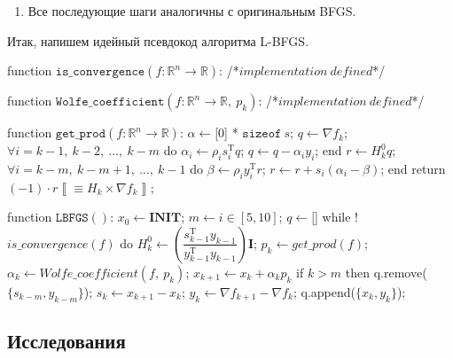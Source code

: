 \documentclass[12pt, a4paper, oneside, final]{article}
\begin{document}
\begin{enumerate}[1)]
		Из всего вышеописанного мы можем провести произведение $H_{k} \times \nabla{f_{k}}$ более эффективно следующим образом
		\begin{lstlisting}
$\alpha \gets$[0] * $\texttt{sizeof}~s$;
$q \gets \nabla{f_{k}}$;
$\forall i = k - 1, ~ k - 2, ~ \ldots, ~ k - m$ do
	$\alpha_{i} \gets \rho_{i}s_{i}^{\mathrm{T}}q$;
	$q \gets q - \alpha_{i}y_{i}$;
end
$r \gets H_{k}^{0}q$;
$\forall i = k - m, ~ k - m + 1, ~ \ldots, ~ k - 1$ do
	$\beta \gets \rho_{i}y_{i}^{\mathrm{T}}r$;
	$r \gets r + s_i(\alpha_i - \beta)$;
end
return $(-1) \cdot r \left\llbracket\equiv H_k \times \nabla{f_{k}}\right\rrbracket$;
		\end{lstlisting}
		Получение нового на данной итерации $H_{k}^{0}$ мы также сильно ускорим, лишь приблизив наши значения, используя формулу $H_{k}^{0} = \gamma_{k}\mathbf{I}$, где
		\[
			\gamma_{k} = \dfrac{s_{k - 1}^{\mathrm{T}}y_{k - 1}}{y_{k - 1}^{\mathrm{T}}y_{k - 1}}
		\]
		\item Все последующие шаги аналогичны с оригинальным BFGS.
	\end{enumerate}
	Итак, напишем идейный псевдокод алгоритма L-BFGS.
	\begin{mylisting}
function $\mathtt{is\_convergence}(f : \mathbb{R}^{n} \to \mathbb{R})$:
	/*$implementation~defined$*/

function $\mathtt{Wolfe\_coefficient}(f : \mathbb{R}^{n} \to \mathbb{R}, ~ p_{k})$:
	/*$implementation~defined$*/

function $\mathtt{get\_prod}(f : \mathbb{R}^{n} \to \mathbb{R})$:
	$\alpha \gets$[0] * $\texttt{sizeof}~s$;
	$q \gets \nabla{f_{k}}$;
	$\forall i = k - 1, ~ k - 2, ~ \ldots, ~ k - m$ do
		$\alpha_{i} \gets \rho_{i}s_{i}^{\mathrm{T}}q$;
		$q \gets q - \alpha_{i}y_{i}$;
	end
	$r \gets H_{k}^{0}q$;
	$\forall i = k - m, ~ k - m + 1, ~ \ldots, ~ k - 1$ do
		$\beta \gets \rho_{i}y_{i}^{\mathrm{T}}r$;
		$r \gets r + s_i(\alpha_i - \beta)$;
	end
	return $(-1) \cdot r \left\llbracket\equiv H_k \times \nabla{f_{k}}\right\rrbracket$;
	
function $\mathtt{LBFGS}()$:
	$x_{0} \gets \mathbf{INIT}$;
	$m \gets i \in [5, 10]$;
	$q \gets$[]
	while !$is\_convergence(f)$ do
		$H_{k}^{0} \gets \left(\dfrac{s_{k - 1}^{\mathrm{T}}y_{k - 1}}{y_{k - 1}^{\mathrm{T}}y_{k - 1}}\right)\mathbf{I}$;
		$p_{k} \gets get\_prod(f)$;
		$\alpha_{k} \gets Wolfe\_coefficient(f, ~ p_{k})$;
		$x_{k + 1} \gets x_{k} + \alpha_{k}p_{k}$
		if $k > m$ then
			q.remove($\{s_{k - m}, y_{k - m}\}$);
		$s_{k} \gets x_{k + 1} - x_{k}$;
		$y_{k} \gets \nabla{f_{k + 1}} - \nabla{f_{k}}$;
		q.append($\{x_{k}, y_{k}\}$);
	\end{mylisting}
	\subsection*{Исследования}
\end{document}
